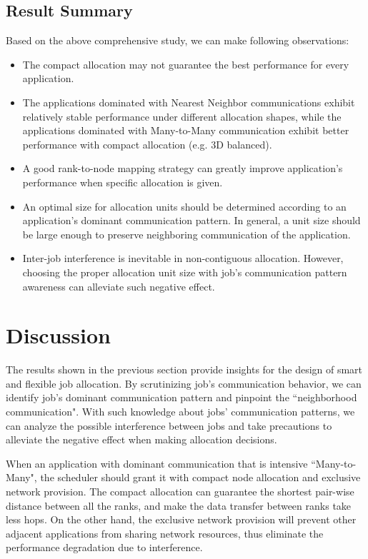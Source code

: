 \documentclass[conference]{IEEEtran}
\begin{document}
\subsection{Result Summary}
\label{sec:summary}

Based on the above comprehensive study, we can make following observations:
\begin{itemize}
    \item The compact allocation may not guarantee the best performance for every application. 
    \item The applications dominated with Nearest Neighbor communications exhibit relatively stable performance under different allocation shapes, while the applications dominated with Many-to-Many communication exhibit better performance with compact allocation (e.g. 3D balanced).
    \item A good rank-to-node mapping strategy can greatly improve application's performance when specific allocation is given.
    \item An optimal size for allocation units should be determined according to an application's dominant communication pattern. In general, a unit size should be large enough to preserve neighboring communication of the application. 
    \item Inter-job interference is inevitable in non-contiguous allocation. However, choosing the proper allocation unit size with job's communication pattern awareness can alleviate such negative effect. 
\end{itemize}






\section{Discussion}
\label{sec:discussion}

The results shown in the previous section provide insights for the design of smart and flexible job allocation. By scrutinizing job's communication behavior, we can identify job's dominant communication pattern and pinpoint the ``neighborhood communication". With such knowledge about jobs' communication patterns, we can analyze the possible interference between jobs and take precautions to alleviate the negative effect when making allocation decisions. 

When an application with dominant communication that is intensive ``Many-to-Many", the scheduler should grant it with compact node allocation and exclusive network provision. The compact allocation can guarantee the shortest pair-wise distance between all the ranks, and make the data transfer between ranks take less hops. On the other hand, the exclusive network provision will prevent other adjacent applications from sharing network resources, thus eliminate the performance degradation due to interference.
\end{document}
